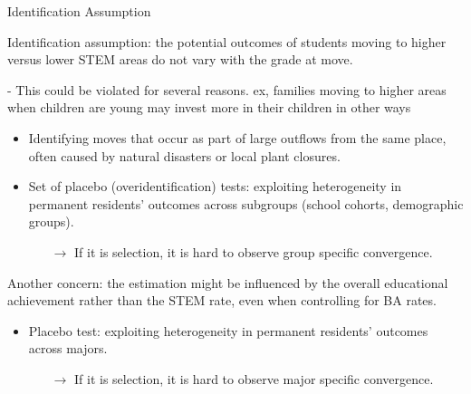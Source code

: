 \documentclass[aspectratio=169,xcolor=dvipsnames]{beamer}
\newenvironment{wideitemize}{\itemize\addtolength{\itemsep}{10pt}}{\enditemize}
\begin{document}
\begin{frame}{Identification Assumption}\label{}
\begin{wideitemize}
    \item Identification assumption: the potential outcomes of students moving to higher versus lower STEM areas do not vary with the grade at move.
    \item[-] This could be violated for several reasons. ex, families moving to higher areas when children are young may invest more in their children in other ways
    \begin{itemize}
        \item Identifying moves that occur as part of large outflows from the same place, often caused by natural disasters or local plant closures.   
        \item Set of placebo (overidentification) tests: exploiting heterogeneity in permanent residents’ outcomes across subgroups (school cohorts, demographic groups).
        \begin{itemize}
            \item[$\rightarrow$] If it is selection, it is hard to observe group specific convergence.
        \end{itemize}
    \end{itemize}
    \pause
    \item Another concern: the estimation might be influenced by the overall educational achievement rather than the STEM rate, even when controlling for BA rates.
    \begin{itemize}
        \item Placebo test: exploiting heterogeneity in permanent residents’ outcomes across majors.
        \begin{itemize}
            \item[$\rightarrow$] If it is selection, it is hard to observe major specific convergence.
        \end{itemize}
    \end{itemize}
\end{wideitemize}    
\end{frame}

        
\end{document}
